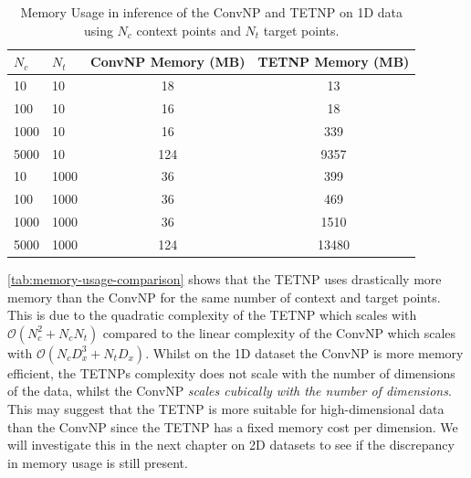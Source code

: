 \documentclass[../../main.tex]{subfiles}
\begin{document}
\begin{table}[htpb!]
	\centering
	\begin{tabular}{@{}llcc@{}}
	\toprule
	$N_c$ & $N_t$ & ConvNP Memory (MB) & TETNP Memory (MB) \\ \midrule
	10    & 10    & 18                 & 13                \\
	100   & 10    & 16                 & 18                \\
	1000  & 10    & 16                 & 339               \\
	5000  & 10    & 124                & 9357              \\ \midrule
	10    & 1000  & 36                 & 399               \\
	100   & 1000  & 36                 & 469               \\
	1000  & 1000  & 36                 & 1510              \\
	5000  & 1000  & 124                & 13480             \\ \bottomrule
	\end{tabular}
	\caption{Memory Usage in inference of the ConvNP and TETNP on 1D data using $N_c$ context points and $N_t$ target points.}
	\label{tab:memory-usage-comparison}
\end{table}

\autoref{tab:memory-usage-comparison} shows that the TETNP uses drastically more memory than the ConvNP for the same number of context and target points. This is due to the quadratic complexity of the TETNP which scales with $\mathcal{O}(N_c^2 + N_cN_t)$ compared to the linear complexity of the ConvNP which scales with $\mathcal{O}(N_cD_x^3 + N_tD_x)$. Whilst on the 1D dataset the ConvNP is more memory efficient, the TETNPs complexity does not scale with the number of dimensions of the data, whilst the ConvNP \emph{scales cubically with the number of dimensions}. This may suggest that the TETNP is more suitable for high-dimensional data than the ConvNP since the TETNP has a fixed memory cost per dimension. We will investigate this in the next chapter on 2D datasets to see if the discrepancy in memory usage is still present.

\ifSubfilesClassLoaded{%
    \printbibliography{}
}{} 
\end{document}
